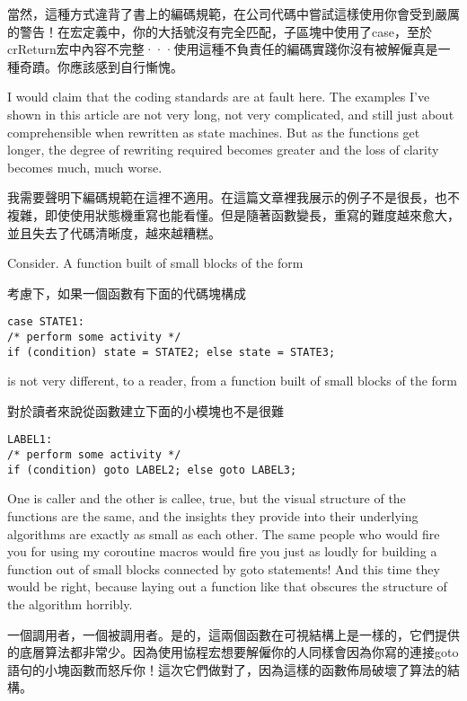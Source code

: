\documentclass[12pt]{article}
\begin{document}
\begin{CJK}{UTF8}{bsmi}
當然，這種方式違背了書上的編碼規範，在公司代碼中嘗試這樣使用你會受到嚴厲的警告！在宏定義中，你的大括號沒有完全匹配，子區塊中使用了case，至於crReturn宏中內容不完整···使用這種不負責任的編碼實踐你沒有被解僱真是一種奇蹟。你應該感到自行慚愧。 

I would claim that the coding standards are at fault here. The examples I've shown in this article are not very long, not very complicated, and still just about comprehensible when rewritten as state machines. But as the functions get longer, the degree of rewriting required becomes greater and the loss of clarity becomes much, much worse.

我需要聲明下編碼規範在這裡不適用。在這篇文章裡我展示的例子不是很長，也不複雜，即使使用狀態機重寫也能看懂。但是隨著函數變長，重寫的難度越來愈大，並且失去了代碼清晰度，越來越糟糕。 

Consider. A function built of small blocks of the form

考慮下，如果一個函數有下面的代碼塊構成 

\begin{lstlisting}[basicstyle=\footnotesize, breaklines=true]
case STATE1:
/* perform some activity */
if (condition) state = STATE2; else state = STATE3;
\end{lstlisting}

is not very different, to a reader, from a function built of small blocks of the form

 對於讀者來說從函數建立下面的小模塊也不是很難 

\begin{lstlisting}[basicstyle=\footnotesize, breaklines=true]
LABEL1:
/* perform some activity */
if (condition) goto LABEL2; else goto LABEL3;
\end{lstlisting}

One is caller and the other is callee, true, but the visual structure of the functions are the same, and the insights they provide into their underlying algorithms are exactly as small as each other. The same people who would fire you for using my coroutine macros would fire you just as loudly for building a function out of small blocks connected by goto statements! And this time they would be right, because laying out a function like that obscures the structure of the algorithm horribly.

 一個調用者，一個被調用者。是的，這兩個函數在可視結構上是一樣的，它們提供的底層算法都非常少。因為使用協程宏想要解僱你的人同樣會因為你寫的連接goto語句的小塊函數而怒斥你！這次它們做對了，因為這樣的函數佈局破壞了算法的結構。 


\end{CJK}
\end{document}
